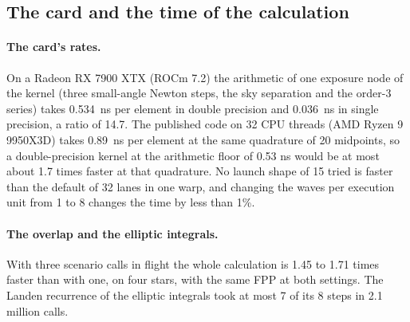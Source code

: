 \documentclass[11pt]{article}
\begin{document}
\subsection{The card and the time of the calculation}

\paragraph{The card's rates.} On a Radeon RX 7900 XTX (ROCm 7.2) the arithmetic of one exposure node of the kernel (three small-angle Newton steps, the sky separation and the order-3 series) takes 0.534~ns per element in double precision and 0.036~ns in single precision, a ratio of 14.7. The published code on 32 CPU threads (AMD Ryzen 9 9950X3D) takes 0.89~ns per element at the same quadrature of 20 midpoints, so a double-precision kernel at the arithmetic floor of 0.53 ns would be at most about 1.7 times faster at that quadrature. No launch shape of 15 tried is faster than the default of 32 lanes in one warp, and changing the waves per execution unit from 1 to 8 changes the time by less than 1\%.


\paragraph{The overlap and the elliptic integrals.} With three scenario calls in flight the whole calculation is 1.45 to 1.71 times faster than with one, on four stars, with the same FPP at both settings. The Landen recurrence of the elliptic integrals took at most 7 of its 8 steps in 2.1 million calls.
\end{document}
